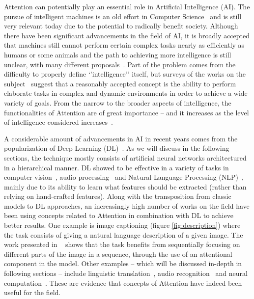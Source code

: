 \documentclass[English]{style/ic-tese-v3}
\begin{document}
Attention can potentially play an essential role in Artificial Intelligence (AI).
The pursue of intelligent machines is an old effort in Computer Science~\cite{ref:turing} and is still very
relevant today due to the potential to radically benefit society.
Although there have been significant advancements in the field of AI, it is broadly accepted that
machines still cannot perform certain complex tasks nearly as efficiently as humans or some animals and
the path to achieving more intelligence is still unclear, with many different proposals~\cite{ref:mikolov}.
Part of the problem comes from the difficulty to properly define `'intelligence'' itself, but
surveys of the works on the subject~\cite{ref:aidef} suggest that a reasonably accepted
concept is the ability to perform elaborate tasks in complex and dynamic environments
in order to achieve a wide variety of goals.
From the narrow to the broader aspects of intelligence, the functionalities of Attention
are of great importance -- and it increases
as the level of intelligence considered increases~\cite{ref:helgason}.

A considerable amount of advancements in AI in recent years comes from
the popularization of Deep Learning (DL)~\cite{ref:dl}.
As we will discuss in the following sections, the technique mostly consists of
artificial neural networks architectured in a hierarchical manner.
DL showed to be effective in a variety of tasks in computer vision~\cite{ref:imagenet}\cite{ref:segmentation},
audio processing~\cite{ref:wavenet} and Natural Language
Processing (NLP)~\cite{ref:att-all-you-need}, mainly due to its ability
to learn what features should be extracted (rather than relying on hand-crafted features).
Along with the transposition from classic models to DL
approaches, an increasingly high number of works on the field
have been using concepts related to Attention in combination with DL to achieve better results.
One example is image captioning (figure \ref{fig:description}) where the task
consists of giving a natural language description of a given image.
The work presented in ~\cite{ref:img-captioning} shows that the task benefits from
sequentially focusing on different parts of the image in a sequence,
through the use of an attentional component in the model.
Other examples -- which will be discussed in-depth in following sections -- include linguistic
translation~\cite{ref:translation}, audio recognition~\cite{ref:audio} and neural computation~\cite{ref:ntm}.
These are evidence that concepts of Attention have indeed been useful for the field.
\end{document}
